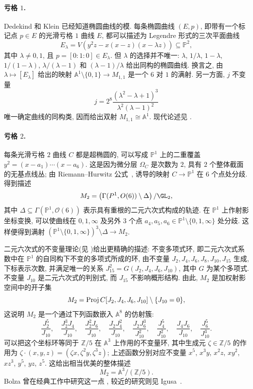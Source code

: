 \paragraph*{亏格 $1$.} Dedekind 和 Klein 已经知道椭圆曲线的模. 每条椭圆曲线 $(E,p)$, 即带有一个标记点 $p\in E$ 的光滑亏格 $1$ 曲线 $E$, 都可以描述为 Legendre 形式的三次平面曲线
\[
E_\lambda=V(y^2z-x(x-z)(x-\lambda z))\subseteq\mathbb P^2,
\]
其中 $\lambda\neq0,1$, 且 $p=[0:1:0]\in E_\lambda$. 但 $\lambda$ 的选择并不唯一: $\lambda$, $1/\lambda$, $1-\lambda$, $1/(1-\lambda)$, $\lambda/(\lambda-1)$ 和 $(\lambda-1)/\lambda$ 给出同构的椭圆曲线. 换言之, 由 $\lambda\mapsto[E_\lambda]$ 给出的映射 $\mathbb A^1\setminus\{0,1\}\to M_{1,1}$ 是一个 $6$ 对 $1$ 的满射. 另一方面, $j$ 不变量
\[
j=2^8\frac{(\lambda^2-\lambda+1)^3}{\lambda^2(\lambda-1)^2}
\]
唯一确定曲线的同构类, 因而给出双射 $M_{1,1}\cong\mathbb A^1$. 现代论述见 \cite[\S$4$]{Har77}.

\paragraph*{亏格 $2$.} 每条光滑亏格 $2$ 曲线 $C$ 都是超椭圆的, 可以写成 $\mathbb P^1$ 上的二重覆盖 $y^2=(x-a_1)\cdots(x-a_6)$. 这是因为微分层 $\Omega_C$ 是次数为 $2$, 具有 $2$ 个整体截面的无基点线丛; 由 Riemann--Hurwitz 公式~, 诱导的映射 $C\to\mathbb P^1$ 在 $6$ 个点处分歧. 得到描述
\[
M_2=\left(\Gamma(\mathbb P^1,\mathcal O(6))\setminus\Delta\right)/\GL_2,
\]
其中 $\Delta\subseteq\Gamma(\mathbb P^1,\mathcal O(6))$ 表示具有重根的二元六次式构成的轨迹. 在 $\mathbb P^1$ 上作射影坐标变换, 可以使曲线在 $0,1,\infty$ 及另外 $3$ 个点 $a_4,a_5,a_6\in\mathbb P^1\setminus\{0,1,\infty\}$ 处分歧. 这样便得到满射 $(\mathbb P^1\setminus\{0,1,\infty\})^3\setminus\Delta\to M_2$.

二元六次式的不变量理论(见 \cite{Cle70})给出更精确的描述: 不变多项式环, 即二元六次式系数中在 $\mathbb P^1$ 的自同构下不变的多项式所成的环, 由不变量 $J_2,J_4,J_6,J_8,J_{10},J_{15}$ 生成, 下标表示次数, 并满足唯一的关系 $J_{15}^2=G(J_2,J_4,J_6,J_{10})$, 其中 $G$ 为某个多项式. 不变量 $J_{10}$ 是二元六次式的判别式, 而 $J_{15}$ 不影响概形结构. 由此, $M_2$ 是加权射影空间中的开子集
\[
M_2=\operatorname{Proj}C[J_2,J_4,J_6,J_{10}]\setminus\{J_{10}=0\},
\]
这说明 $M_2$ 是一个通过下列函数嵌入 $\mathbb A^8$ 的仿射簇: 
\[
\frac{J_2^5}{J_{10}},\quad
\frac{J_2^3J_4}{J_{10}},\quad
\frac{J_2^2J_6}{J_{10}},\quad
\frac{J_2J_4^2}{J_{10}},\quad
\frac{J_2J_6^3}{J_{10}^2},\quad
\frac{J_4^5}{J_{10}^2},\quad
\frac{J_4J_6}{J_{10}},\quad
\frac{J_6^5}{J_{10}^3}.
\]
可以把这个坐标环等同于 $\mathbb Z/5$ 在 $\mathbb A^3$ 上作用的不变量环, 其中生成元 $\zeta\in\mathbb Z/5$ 的作用为 $\zeta\cdot(x,y,z)=(\zeta x,\zeta^2y,\zeta^3z)$; 上述函数分别对应不变量 $x^5$, $x^3y$, $x^2z$, $xy^2$, $xz^3$, $y^5$, $yz$, $z^5$. 这给出相当优美的整体描述
\[
M_2=\mathbb A^3/(\mathbb Z/5).
\]
Bolza 曾在经典工作中研究这一点 \cite{Bol87}, 较近的研究则见 Igusa~\cite{Igu60}.

